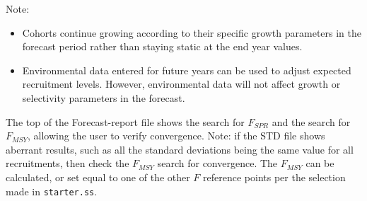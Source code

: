 Note:
\begin{itemize}
	\item Cohorts continue growing according to their specific growth parameters in the forecast period rather than staying static at the end year values.
	\item Environmental data entered for future years can be used to adjust expected recruitment levels. However, environmental data will not affect growth or selectivity parameters in the forecast.
\end{itemize}

The top of the Forecast-report file shows the search for $F_{SPR}$ and the search for $F_{MSY}$, allowing the user to verify convergence. Note: if the STD file shows aberrant results, such as all the standard deviations being the same value for all recruitments, then check the $F_{MSY}$ search for convergence. The $F_{MSY}$ can be calculated, or set equal to one of the other $F$ reference points per the selection made in \texttt{starter.ss}. 

\pagebreak
